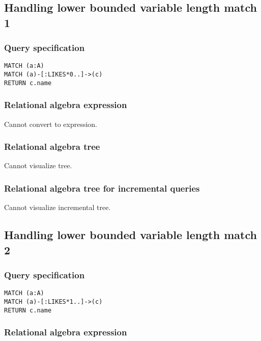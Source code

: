 \subsection{Handling lower bounded variable length match 1}

\subsubsection*{Query specification}

\begin{lstlisting}
MATCH (a:A)
MATCH (a)-[:LIKES*0..]->(c)
RETURN c.name
\end{lstlisting}

\subsubsection*{Relational algebra expression}

Cannot convert to expression.

\subsubsection*{Relational algebra tree}

Cannot visualize tree.

\subsubsection*{Relational algebra tree for incremental queries}

Cannot visualize incremental tree.

\subsection{Handling lower bounded variable length match 2}

\subsubsection*{Query specification}

\begin{lstlisting}
MATCH (a:A)
MATCH (a)-[:LIKES*1..]->(c)
RETURN c.name
\end{lstlisting}

\subsubsection*{Relational algebra expression}

